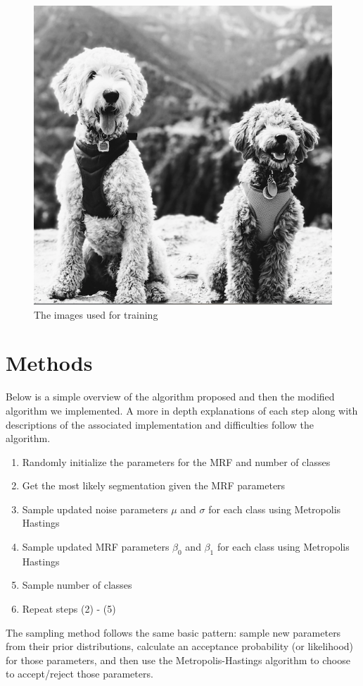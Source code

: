 \documentclass[11pt]{article}
\begin{document}
\begin{figure}[!htb]
\begin{center}
\begin{multicols}{3}
	\includegraphics[height = \linewidth]{targetpractice}\par
\end{multicols}
\caption{The images used for training}
\end{center}
\end{figure}

\section{Methods}
Below is a simple overview of the algorithm proposed and then the modified algorithm we implemented.
A more in depth explanations of each step along with descriptions of the associated implementation and difficulties follow the algorithm.

\begin{enumerate}
	\item Randomly initialize the parameters for the MRF and number of classes
	\item Get the most likely segmentation given the MRF parameters
	\item Sample updated noise parameters $\mu$ and $\sigma$ for each class using Metropolis Hastings
	\item Sample updated MRF parameters $\beta_0$ and $\beta_1$ for each class using Metropolis Hastings
	\item Sample number of classes
	\item Repeat steps (2) - (5)
\end{enumerate}
The sampling method follows the same basic pattern: sample new parameters from their prior distributions, calculate an acceptance probability (or likelihood) for those parameters, and then use the Metropolis-Hastings algorithm to choose to accept/reject those parameters.
\end{document}
